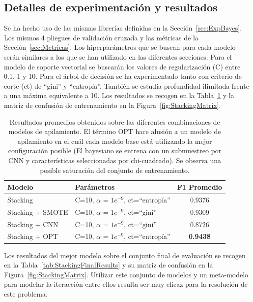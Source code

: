 \documentclass[12pt,letterpaper]{article}
\begin{document}
\subsection{Detalles de experimentación y resultados} 
Se ha hecho uso de las mismas librerías definidas en la Sección~\ref{sec:ExpBayes}. Los mismos 4 pliegues de validación cruzada y las métricas de la Sección~\ref{sec:Metricas}.
Los hiperparámetros que se buscan para cada modelo serán similares a los que se han utilizado en las diferentes secciones.
Para el modelo de soporte vectorial se buscarán los valores de regularización (C) entre 0.1, 1 y 10.
Para el árbol de decisión se ha experimentado tanto con criterio de corte (ct) de ``gini'' y ``entropía''. También se estudia profundidad ilimitada frente a una máxima equivalente a 10.
Los resultados se recogen en la Tabla~\ref{tab:StackingResults} y la matriz de confusión de entrenamiento en la Figura~\ref{fig:StackingMatrix}.

\begin{table}[htp]
    \centering
    \begin{tabular}{llc}
        \hline
        \textbf{Modelo} & \textbf{Parámetros} &\textbf{F1 Promedio} \\\hline
        Stacking & C=10, $\alpha$ = $1e^{-9}$, ct=``entropía''& 0.9376\\ 
        Stacking + SMOTE & C=10, $\alpha$ = $1e^{-9}$, ct=``gini''& 0.9309 \\ 
        Stacking + CNN & C=10, $\alpha$ = $1e^{-9}$, ct=``gini'' & 0.8726 \\ 
        Stacking + OPT & C=10, $\alpha$ = $1e^{-9}$, ct=``entropía''& \textbf{0.9438} \\ 
        \hline
    \end{tabular}
    \caption{Resultados promedios obtenidos sobre las diferentes combinaciones de modelos de apilamiento. El término OPT hace alusión a un modelo de apilamiento en el cuál cada modelo base está utilizando la mejor configuración posible (El bayesiano se entrena con un submuestreo por CNN y características seleccionadas por chi-cuadrado). Se observa una posible saturación del conjunto de entrenamiento.} 
    \label{tab:StackingResults}
\end{table}

Los resultados del mejor modelo sobre el conjunto final de evaluación se recogen en la Tabla~\ref{tab:StackingFinalResults} y su matriz de confusión en la Figura~\ref{fig:StackingMatrix}.
Utilizar este conjunto de modelos y un meta-modelo para modelar la iteracción entre ellos resulta ser muy eficaz para la resolución de este problema.
\end{document}
